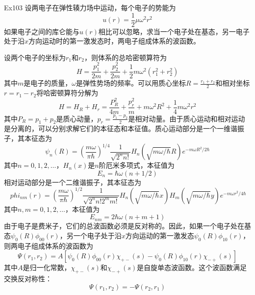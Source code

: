 \begin{question}{Ex103}
    设两电子在弹性辏力场中运动，每个电子的势能为
    $$
        u(r)=\frac{1}{2}\mu\omega^2r^2
    $$
    如果电子之间的库仑能与$u(r)$相比可以忽略，求当一个电子处在基态，另一电子处于沿$x$方向运动时的第一激发态时，两电子组成体系的波函数。
\end{question}
\begin{solution}
    设两个电子的坐标为$r_1$和$r_2$，则体系的总哈密顿算符为
    $$
        H=\frac{p_1^2}{2m}+\frac{p_2^2}{2m}+\frac{1}{2}m\omega^2(r_1^2+r_2^2)
    $$
    其中$m$是电子的质量，$\omega$是弹性势场的频率。可以用质心坐标$R=\frac{r_1+r_2}{2}$和相对坐标$r=r_1-r_2$将哈密顿算符分解为
    $$
        H=H_R+H_r=\frac{P_R^2}{4m}+\frac{p_r^2}{m}+m\omega^2R^2+\frac{1}{4}m\omega^2r^2
    $$
    其中$P_R=p_1+p_2$是质心动量，$p_r=\frac{p_1-p_2}{2}$是相对动量。由于质心运动和相对运动是分离的，可以分别求解它们的本征态和本征值。质心运动部分是一个一维谐振子，其本征态为
    $$
        \psi_n(R)=\left(\frac{m\omega}{\pi\hbar}\right)^{1/4}\frac{1}{\sqrt{2^n n!}}H_n(\sqrt{m\omega/\hbar}R)e^{-m\omega R^2/2\hbar}
    $$
    其中$n=0,1,2,\dots$，$H_n(x)$是$n$阶厄米多项式，本征值为
    $$
        E_n=\hbar\omega(n+1/2)
    $$
    相对运动部分是一个二维谐振子，其本征态为
    $$\
        phi_{nm}(r)=\left(\frac{m\omega}{\pi\hbar}\right)^{1/2}\frac{1}{\sqrt{2^n n! 2^m m!}}H_n(\sqrt{m\omega/\hbar}x)H_m(\sqrt{m\omega/\hbar}y)e^{-m\omega r^2/4\hbar}
    $$
    其中$n,m=0,1,2,\dots$，本征值为
    $$
        E_{nm}=2\hbar\omega(n+m+1)
    $$
    由于电子是费米子，它们的总波函数必须是反对称的。因此，如果一个电子处在基态$\psi_0(R)\phi_{00}(r)$，另一个电子处于沿$x$方向运动的第一激发态$\psi_0(R)\phi_{10}(r)$，则两电子组成体系的波函数为
    $$
        \Psi(r_1,r_2)=A[\psi_0(R)\phi_{00}(r)\chi_{+-}(s)-\psi_0(R)\phi_{10}(r)\chi_{-+}(s)]
    $$
    其中$A$是归一化常数，$\chi_{+-}(s)$和$\chi_{-+}(s)$是自旋单态波函数。这个波函数满足交换反对称性：
    $$
        \Psi(r_1,r_2)=-\Psi(r_2,r_1)
    $$
\end{solution}





